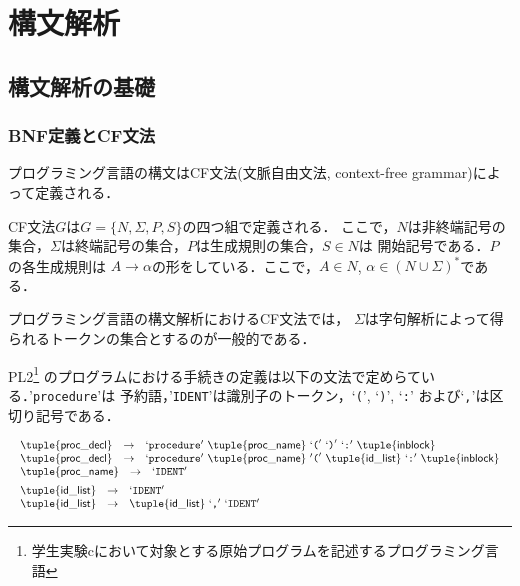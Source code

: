 \documentclass[a4j,dvipdfmx]{jbook}
\begin{document}
\chapter{構文解析}
\section{構文解析の基礎}
\subsection{BNF定義とCF文法}

プログラミング言語の構文はCF文法(文脈自由文法, context-free grammar)によって定義される．

\begin{Def}
CF文法$G$は$G=\{N,\Sigma,P,S\}$の四つ組で定義される．
ここで，$N$は非終端記号の集合，$\Sigma$は終端記号の集合，$P$は生成規則の集合，$S\in N$は
開始記号である．$P$の各生成規則は $A\rightarrow\alpha$の形をしている．ここで，$A\in N$,
$\alpha\in (N\cup\Sigma)^\ast$である．
\end{Def}

プログラミング言語の構文解析におけるCF文法では，
$\Sigma$は字句解析によって得られるトークンの集合とするのが一般的である．

PL2\footnote{学生実験cにおいて対象とする原始プログラムを記述するプログラミング言語}
のプログラムにおける手続きの定義は以下の文法で定めらている．'\texttt{procedure}'は
予約語，'\texttt{IDENT}'は識別子のトークン，`\texttt{(}', `\texttt{)}', `\texttt{:}'
および`\texttt{,}'は区切り記号である．

\[\begin{array}{l}
\begin{array}{rcl}
  \tuple{\mathsf{proc\_decl}} & \rightarrow & `\texttt{procedure}'\ \tuple{\mathsf{proc\_name}}\ `\texttt{(}'\ `\texttt{)}'\ `\texttt{:}'\ \tuple{\mathsf{inblock}}\\
  \tuple{\mathsf{proc\_decl}} & \rightarrow & `\texttt{procedure}'\ \tuple{\mathsf{proc\_name}}\ '\texttt{(}'\ \tuple{\mathsf{id\_list}}\ `\texttt{:}'\ \tuple{\mathsf{inblock}}\\ 
\end{array}\\[5pt]
\begin{array}{rcl}
  \tuple{\mathsf{proc\_name}} & \rightarrow & `\texttt{IDENT}'
\end{array}\\[5pt]
\begin{array}{rcl}
  \tuple{\mathsf{id\_list}} & \rightarrow & `\texttt{IDENT}'\\
  \tuple{\mathsf{id\_list}} & \rightarrow & \tuple{\mathsf{id\_list}}\ `\texttt{,}'\ `\texttt{IDENT}'
\end{array}
\end{array}\]
\end{document}
